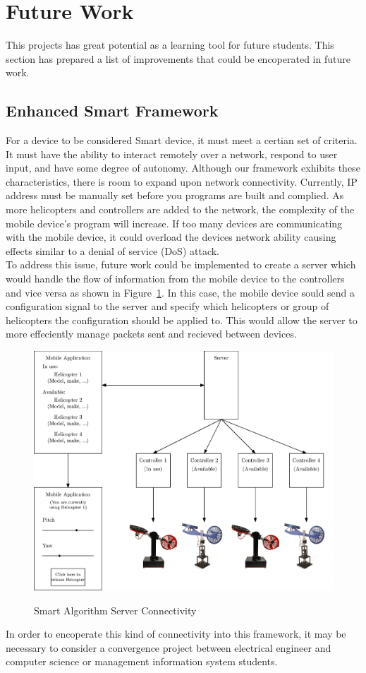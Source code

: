 \section{Future Work}
This projects has great potential as a learning tool for future students.  This section has prepared a list of improvements that could be encoperated in future work.

\subsection{Enhanced Smart Framework}
For a device to be considered Smart device, it must meet a certian set of criteria.  It must have the ability to interact remotely over a network, respond to user input, and have some degree of autonomy.  Although our framework exhibits these characteristics, there is room to expand upon network connectivity.  Currently, IP address must be manually set before you programs are built and complied.  As more helicopters and controllers are added to the network, the complexity of the mobile device's program will increase.  If too many devices are communicating with the mobile device, it could overload the devices network ability causing effects similar to a denial of service (DoS) attack.\\
To address this issue, future work could be implemented to create a server which would handle the flow of information from the mobile device to the controllers and vice versa as shown in Figure~\ref{fig:Smart_Alg}.  In this case, the mobile device sould send a configuration signal to the server and specify which helicopters or group of helicopters the configuration should be applied to.  This would allow the server to more effeciently manage packets sent and recieved between devices.\\
\begin{figure}[!htbp]
    \centering
    \includegraphics[width=.46\textwidth,keepaspectratio=true]{figs/ipe/smartAlg.eps}
    \label{fig:Smart_Alg}
    \caption{Smart Algorithm Server Connectivity}
\end{figure}
In order to encoperate this kind of connectivity into this framework, it may be necessary to consider a convergence project between electrical engineer and computer science or management information system students.

